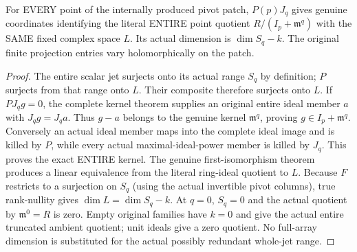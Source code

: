 \begin{theorem}
\label{hir:actual-entire-point-quotient-pivot-frame}
\leanok
{}
For EVERY point of the internally produced pivot patch, $P(p)J_q$ gives genuine
coordinates identifying the literal ENTIRE point quotient
$R/(I_p+\mathfrak m^q)$ with the SAME fixed complex space $L$. Its actual dimension
is $\dim S_q-k$. The original finite projection entries vary holomorphically on
the patch.
\end{theorem}
\begin{proof}
The entire scalar jet surjects onto its actual range $S_q$ by definition; $P$
surjects from that range onto $L$. Their composite therefore surjects onto $L$.
If $P J_q g=0$, the complete kernel theorem supplies an original entire ideal
member $a$ with $J_qg=J_qa$. Thus $g-a$ belongs to the genuine kernel
$\mathfrak m^q$, proving $g\in I_p+\mathfrak m^q$. Conversely an actual ideal
member maps into the complete ideal image and is killed by $P$, while every
actual maximal-ideal-power member is killed by $J_q$. This proves the exact
ENTIRE kernel. The genuine first-isomorphism theorem produces a linear
equivalence from the literal ring-ideal quotient to $L$. Because $F$ restricts
to a surjection on $S_q$ (using the actual invertible pivot columns), true
rank-nullity gives $\dim L=\dim S_q-k$. At $q=0$, $S_q=0$ and the actual quotient
by $\mathfrak m^0=R$ is zero. Empty original families have $k=0$ and give the
actual entire truncated ambient quotient; unit ideals give a zero quotient.
No full-array dimension is substituted for the actual possibly redundant
whole-jet range.
\end{proof}

